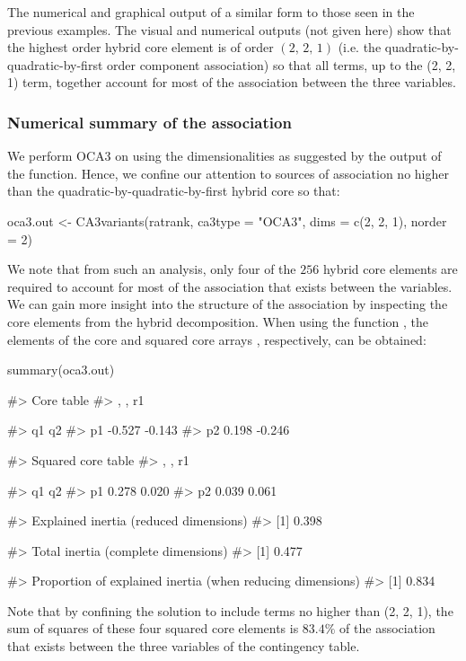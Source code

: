 The numerical and graphical output of a similar form to those seen in the previous examples. 
The visual and numerical outputs (not given here) show that the highest order hybrid core element is of order $\left(2,\, 2,\, 1\right)$ (i.e. the quadratic-by-quadratic-by-first order component association) so that all terms, up to the (2, 2, 1) term, together account for most of the association between the three variables.

\subsubsection{Numerical summary of the association}

We perform OCA3 on  using the dimensionalities as suggested by the output of the  function. Hence, we confine our attention to sources of association no higher than the quadratic-by-quadratic-by-first hybrid core so that:

\begin{example}
oca3.out <- CA3variants(ratrank, ca3type = "OCA3", dims = c(2, 2, 1), norder = 2)
\end{example}

We note that from such an analysis, only four of the $256$ hybrid core elements are required to account for most of the association that exists between the variables. We can gain more insight into the structure of the association by inspecting the core elements from the hybrid decomposition. When using the function ,
the elements of the core and squared core arrays \cite[]{lombehkro21}, respectively, can be obtained:  	
\begin{example}
summary(oca3.out)

#> Core table 
#> , , r1

#>       q1     q2
#> p1 -0.527 -0.143
#> p2  0.198 -0.246

#> Squared core table
#> , , r1

#>      q1    q2
#> p1 0.278 0.020
#> p2 0.039 0.061

#> Explained inertia (reduced dimensions)
#> [1] 0.398

#> Total inertia (complete dimensions)
#> [1] 0.477

#> Proportion of explained inertia (when reducing dimensions)
#> [1] 0.834
\end{example}
Note that by confining the solution to include terms no higher than (2, 2, 1), the sum of squares of these four squared core elements is $83.4\%$  of the association that exists between the three variables of the contingency table. 

